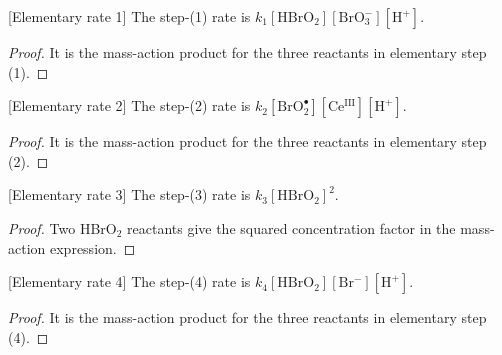 \begin{definition}

[Elementary rate 1]
\label{def:chem:bz:rate1}
The step-(1) rate is $k_1[\mathrm{HBrO_2}][\mathrm{BrO_3^-}][\mathrm{H^+}]$.
\end{definition}
\begin{proof}

It is the mass-action product for the three reactants in elementary step
(1).
\end{proof}

\begin{definition}

[Elementary rate 2]
\label{def:chem:bz:rate2}
The step-(2) rate is
$k_2[\mathrm{BrO_2^\bullet}][\mathrm{Ce^{III}}][\mathrm{H^+}]$.
\end{definition}
\begin{proof}

It is the mass-action product for the three reactants in elementary step
(2).
\end{proof}

\begin{definition}

[Elementary rate 3]
\label{def:chem:bz:rate3}
The step-(3) rate is $k_3[\mathrm{HBrO_2}]^2$.
\end{definition}
\begin{proof}

Two HBrO$_2$ reactants give the squared concentration factor in the
mass-action expression.
\end{proof}

\begin{definition}

[Elementary rate 4]
\label{def:chem:bz:rate4}
The step-(4) rate is $k_4[\mathrm{HBrO_2}][\mathrm{Br^-}][\mathrm{H^+}]$.
\end{definition}
\begin{proof}

It is the mass-action product for the three reactants in elementary step
(4).
\end{proof}

